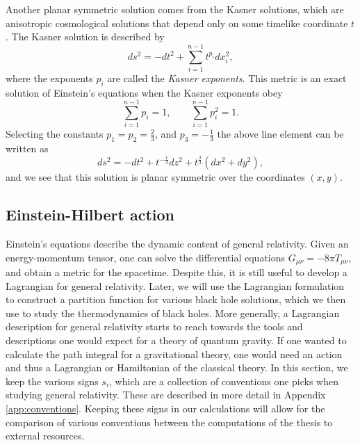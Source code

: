 Another planar symmetric solution comes from the Kasner solutions, which are anisotropic cosmological solutions that depend only on some timelike coordinate $t$. The Kasner solution is described by \cite{Kasner:1921zz}
\begin{equation*}
	ds^2 = -dt^2 +  \sum_{i = 1}^{n-1} t^{p_i} dx_i^2,
\end{equation*}
where the exponents $p_i$ are called the \emph{Kasner exponents}. This metric is an exact solution of Einstein's equations when the Kasner exponents obey
\begin{equation*}
	\sum_{i = 1}^{n-1} p_i = 1, \qquad \sum_{i = 1}^{n-1} p_i^2 = 1.
\end{equation*}
Selecting the constants $p_1 = p_2 = \tfrac{2}{3}$, and $p_3 = - \tfrac{1}{3}$ the above line element can be written as
\begin{equation*}
	ds^2 = - dt^2 + t^{-\frac{1}{3}} dz^2 +  t^{\frac{2}{3}} (dx^2 + dy^2),
\end{equation*} 
and we see that this solution is planar symmetric over the coordinates $(x,y)$.

\subsection{Einstein-Hilbert action}
\label{sec:action}

Einstein's equations describe the dynamic content of general relativity. Given an energy-momentum tensor, one can solve the differential equations $G_{\mu \nu} = - 8\pi T_{\mu \nu}$, and obtain a metric for the spacetime. Despite this, it is still useful to develop a Lagrangian for general relativity. Later, we will use the Lagrangian formulation to construct a partition function for various black hole solutions, which we then use to study the thermodynamics of black holes. More generally, a Lagrangian description for general relativity starts to reach towards the tools and descriptions one would expect for a theory of quantum gravity. If one wanted to calculate the path integral for a gravitational theory, one would need an action and thus a Lagrangian or Hamiltonian of the classical theory. In this section, we keep the various signs $s_i$, which are a collection of conventions one picks when studying general relativity. These are described in more detail in Appendix \ref{app:conventions}. Keeping these signs in our calculations will allow for the comparison of various conventions between the computations of the thesis to external resources.

